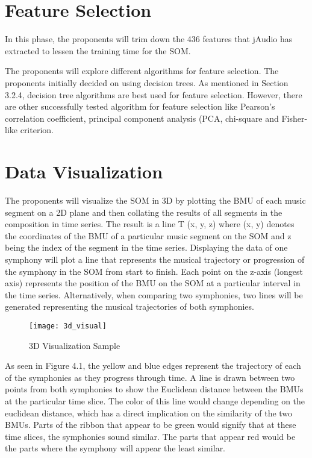 \section{Feature Selection}
In this phase, the proponents will trim down the 436 features that jAudio has extracted to lessen the training time for the SOM. 

The proponents will explore different algorithms for feature selection. The proponents initially decided on using decision trees.  As mentioned in Section 3.2.4, decision tree algorithms are best used for feature selection. However, there are other successfully tested algorithm for feature selection like Pearson's correlation coefficient, principal component analysis (PCA, chi-square and Fisher-like criterion.

\section{Data Visualization}
The proponents will visualize the SOM in 3D by plotting the BMU of each music segment on a 2D plane and then collating the results of all segments in the composition in time series. The result is a line T (x, y, z) where (x, y) denotes the coordinates of the BMU of a particular music segment on the SOM and z being the index of the segment in the time series. Displaying the data of one symphony will plot a line that represents the musical trajectory or progression of the symphony in the SOM from start to finish. Each point on the z-axis (longest axis) represents the position of the BMU on the SOM at a particular interval in the time series. Alternatively, when comparing two symphonies, two lines will be generated representing the musical trajectories of both symphonies.

\begin{figure}[h]
\caption{3D Visualization Sample}
\centering
\texttt{[image: 3d\_visual]}
\end{figure}

As seen in Figure 4.1, the yellow and blue edges represent the trajectory of each of the symphonies as they progress through time. A line is drawn between two points from both symphonies to show the Euclidean distance between the BMUs at the particular time slice. The color of this line would change depending  on the euclidean distance, which has a direct implication on the similarity of the two BMUs. Parts of the ribbon that appear to be green would signify that at these time slices, the symphonies sound similar. The parts that appear red would be the parts where the symphony will appear the least similar.

